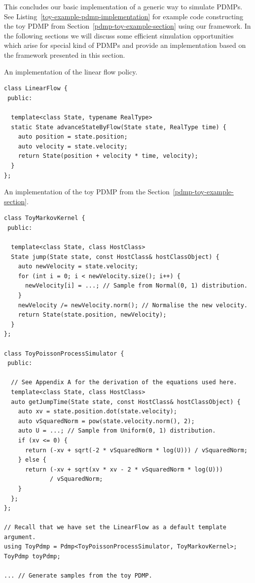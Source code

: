 \documentclass[report.tex]{subfiles}
\begin{document}
This concludes our basic implementation of a generic way to simulate PDMPs.
See Listing~\ref{toy-example-pdmp-implementation} for example code constructing
the toy PDMP from Section~\ref{pdmp-toy-example-section} using our framework.
In the following sections we will discuss some efficient simulation opportunities
which arise for special kind of PDMPs and provide an implementation based on the
framework presented in this section.

\begin{lstfloat}
\caption{An implementation of the linear flow policy.}
\label{linear-flow-implementation}
\begin{lstlisting}
class LinearFlow {
 public:

  template<class State, typename RealType>
  static State advanceStateByFlow(State state, RealType time) {
    auto position = state.position;
    auto velocity = state.velocity;
    return State(position + velocity * time, velocity);
  }
};
\end{lstlisting}
\end{lstfloat}

\begin{lstfloat}
\caption{An implementation of the toy PDMP from the Section~\ref{pdmp-toy-example-section}.}
\label{toy-example-pdmp-implementation}
\begin{lstlisting}
class ToyMarkovKernel {
 public:

  template<class State, class HostClass>
  State jump(State state, const HostClass& hostClassObject) {
    auto newVelocity = state.velocity;
    for (int i = 0; i < newVelocity.size(); i++) {
      newVelocity[i] = ...; // Sample from Normal(0, 1) distribution.
    }
    newVelocity /= newVelocity.norm(); // Normalise the new velocity.
    return State(state.position, newVelocity);
  }
};

class ToyPoissonProcessSimulator {
 public:

  // See Appendix A for the derivation of the equations used here.
  template<class State, class HostClass>
  auto getJumpTime(State state, const HostClass& hostClassObject) {
    auto xv = state.position.dot(state.velocity);
    auto vSquaredNorm = pow(state.velocity.norm(), 2);
    auto U = ...; // Sample from Uniform(0, 1) distribution.
    if (xv <= 0) {
      return (-xv + sqrt(-2 * vSquaredNorm * log(U))) / vSquaredNorm;
    } else {
      return (-xv + sqrt(xv * xv - 2 * vSquaredNorm * log(U)))
             / vSquaredNorm;
    }
  };
};

// Recall that we have set the LinearFlow as a default template argument.
using ToyPdmp = Pdmp<ToyPoissonProcessSimulator, ToyMarkovKernel>;
ToyPdmp toyPdmp;

... // Generate samples from the toy PDMP.
\end{lstlisting}
\end{lstfloat}
\end{document}
